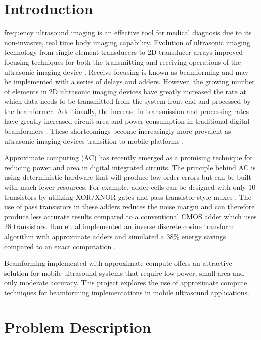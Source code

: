 \documentclass[journal]{IEEEtran}
\begin{document}
\section{Introduction}

 frequency ultrasound imaging is an effective tool for medical diagnosis due to its non-invasive, real time body imaging capability. Evolution of ultrasonic imaging technology from single element transducers to 2D transducer arrays improved focusing techniques for both the transmitting and receiving operations of the ultrasonic imaging device \cite{2dCMUT}. Receive focusing is known as beamforming and may be implemented with a series of delays and adders. However, the growing number of elements in 2D ultrasonic imaging devices have greatly increased the rate at which data needs to be transmitted from the system front-end and processed by the beamformer. Additionally, the increase in transmission and processing rates have greatly increased circuit area and power consumption in traditional digital beamformers \cite{ultrasoundLinearArray}. These shortcomings become increasingly more prevalent as ultrasonic imaging devices transition to mobile platforms \cite{mobileUltrasound}. 



Approximate computing (AC) has recently emerged as a promising technique for reducing power and area in digital integrated circuits. The principle behind AC is using deterministic hardware that will produce low order errors but can be built with much fewer resources. For example, adder cells can be designed with only 10 transistors by utilizing XOR/XNOR gates and pass transistor style muxes \cite{yang2013approximate}. The use of pass transistors in these adders reduces the noise margin and can therefore produce less accurate results compared to a conventional CMOS adder which uses 28 transistors. Han et. al implemented an inverse discrete cosine transform algorithm with approximate adders and simulated a 38\% energy savings compared to an exact computation \cite{han2013approximate}.

Beamforming implemented with approximate compute offers an attractive solution for mobile ultrasound systems that require low power, small area and only moderate accuracy. This project explores the use of approximate compute techniques for beamforming implementations in mobile ultrasound applications. 

\section{Problem Description}
\end{document}
